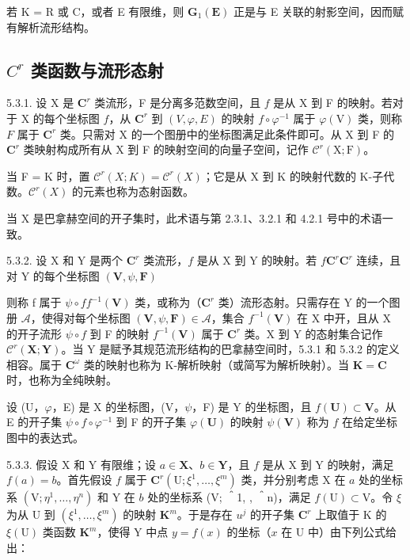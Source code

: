 若 K = R 或 C，或者 E 有限维，则 \(\mathbf{G}_{1}(\mathbf{E})\) 正是与 E 关联的射影空间，因而赋有解析流形结构。

\subsection{\texorpdfstring{\(C^{r}\) 类函数与流形态射}{C\^{}\{r\} 类函数与流形态射}}

5.3.1. 设 X 是 \(\mathbf{C}^{r}\) 类流形，F 是分离多范数空间，且 \(f\) 是从 X 到 F 的映射。若对于 X 的每个坐标图 \(f\)，从 \(\mathbf{C}^{r}\) 到 \((V, \varphi, E)\) 的映射 \(f\circ\varphi^{-1}\) 属于 \(\varphi(\mathrm V)\) 类，则称 \(F\) 属于 \(\mathbf{C}^{r}\) 类。只需对 X 的一个图册中的坐标图满足此条件即可。从 X 到 F 的 \(\mathbf{C}^{r}\) 类映射构成所有从 X 到 F 的映射空间的向量子空间，记作 \(\mathcal{C}^{r}(\mathrm{X};\mathrm{F})\)。

当 F = K 时，置 \(\mathcal{C}^{r}(X;K)=\mathcal{C}^{r}(X)\)；它是从 X 到 K 的映射代数的 K-子代数。\(\mathcal{C}^{r}(X)\) 的元素也称为态射函数。

当 X 是巴拿赫空间的开子集时，此术语与第 2.3.1、3.2.1 和 4.2.1 号中的术语一致。

5.3.2. 设 X 和 Y 是两个 \(\mathbf{C}^{r}\) 类流形，\(f\) 是从 X 到 Y 的映射。若 \(f\)\(\mathbf{C}^{r}\)\(\mathbf{C}^{r}\) 连续，且对 Y 的每个坐标图 \((\mathbf{V},\psi ,\mathbf{F})\)

则称 f 属于 \(\psi \circ f\)\(f^{-1}(\mathbf{V})\) 类，或称为（\(\mathbf{C}^{r}\) 类）流形态射。只需存在 Y 的一个图册 \(\mathcal{A}\)，使得对每个坐标图 \((\mathbf{V}, \psi, \mathbf{F}) \in \mathcal{A}\)，集合 \(f^{-1}(\mathbf{V})\) 在 X 中开，且从 X 的开子流形 \(\psi \circ f\) 到 F 的映射 \(f^{-1}(\mathbf{V})\) 属于 \(\mathbf{C}^{r}\) 类。X 到 Y 的态射集合记作 \(\mathcal{C}^{r}(\mathbf{X}; \mathbf{Y})\)。当 Y 是赋予其规范流形结构的巴拿赫空间时，5.3.1 和 5.3.2 的定义相容。属于 \(\mathbf{C}^{\omega}\) 类的映射也称为 K-解析映射（或简写为解析映射）。当 \(\mathbf{K} = \mathbf{C}\) 时，也称为全纯映射。

设 (U，\(\varphi\)，E) 是 X 的坐标图，(V，\(\psi\)，F) 是 Y 的坐标图，且 \(f(\mathbf{U}) \subset \mathbf{V}\)。从 E 的开子集 \(\psi \circ f \circ \varphi^{-1}\) 到 F 的开子集 \(\varphi(\mathbf{U})\) 的映射 \(\psi(\mathbf{V})\) 称为 \(f\) 在给定坐标图中的表达式。

5.3.3. 假设 X 和 Y 有限维；设 \(a \in \mathbf{X}\)、\(b \in \mathbf{Y}\)，且 \(f\) 是从 X 到 Y 的映射，满足 \(f(a) = b\)。首先假设 \(f\) 属于 \(\mathbf{C}^r\)\((\mathrm{U}; \xi^1, \ldots, \xi^m)\) 类，并分别考虑 X 在 \(a\) 处的坐标系 \((\mathrm{V}; \eta^1, \ldots, \eta^n)\) 和 Y 在 \(b\) 处的坐标系 (V; ＾1, , ＾n)，满足 \(f(\mathrm{U}) \subset \mathrm{V}\)。令 \(\xi\) 为从 U 到 \((\xi^1, \ldots, \xi^m)\) 的映射 \(\mathbf{K}^m\)。于是存在 \(u^j\) 的开子集 \(\mathbf{C}^r\) 上取值于 K 的 \(\xi(\mathrm{U})\) 类函数 \(\mathbf{K}^m\)，使得 Y 中点 \(y = f(x)\) 的坐标（\(x\) 在 U 中）由下列公式给出：

